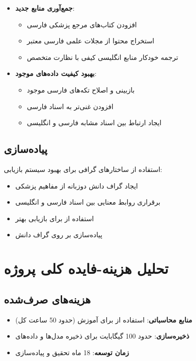 \documentclass[11pt, a4paper, oneside]{book}
\begin{document}
	\begin{itemize}
		\item \textbf{جمع‌آوری منابع جدید}:
		\begin{itemize}
			\item افزودن کتاب‌های مرجع پزشکی فارسی
			\item استخراج محتوا از مجلات علمی فارسی معتبر
			\item ترجمه خودکار منابع انگلیسی کیفی با نظارت متخصص
		\end{itemize}
		
		\item \textbf{بهبود کیفیت داده‌های موجود}:
		\begin{itemize}
			\item بازبینی و اصلاح تکه‌های فارسی موجود
			\item افزودن  غنی‌تر به اسناد فارسی
			\item ایجاد ارتباط بین اسناد مشابه فارسی و انگلیسی
		\end{itemize}
	\end{itemize}

	\subsection{پیاده‌سازی }

	استفاده از ساختارهای گرافی برای بهبود سیستم بازیابی:

	\begin{itemize}
		\item ایجاد گراف دانش دوزبانه از مفاهیم پزشکی
		\item برقراری روابط معنایی بین اسناد فارسی و انگلیسی
		\item استفاده از  برای بازیابی بهتر
		\item پیاده‌سازی  بر روی گراف دانش
	\end{itemize}

	\section{تحلیل هزینه-فایده کلی پروژه}

	\subsection{هزینه‌های صرف‌شده}

	\begin{itemize}
		\item \textbf{منابع محاسباتی}: استفاده از  برای آموزش (حدود 50 ساعت کل)
		\item \textbf{ذخیره‌سازی}: حدود 100 گیگابایت برای ذخیره مدل‌ها و داده‌های 
		\item \textbf{زمان توسعه}: 18 ماه تحقیق و پیاده‌سازی
	\end{itemize}
\end{document}
